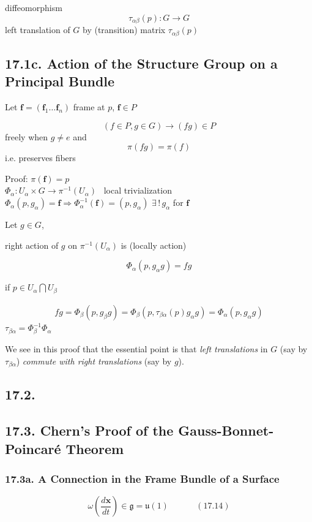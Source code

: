 diffeomorphism 
\[
\tau_{\alpha \beta}(p)  : G \to G
\]
left translation of $G$ by (transition) matrix $\tau_{\alpha \beta}(p)$



\subsection{ 17.1c. Action of the Structure Group on a Principal Bundle}

Let $\mathbf{f} = (\mathbf{f}_1 \dots \mathbf{f}_n)$ frame at $p$, $\mathbf{f} \in P$

\begin{theorem}[17.8]
  \[
(f \in P , g\in G) \to (fg) \in P 
\]
freely when $g\neq e$ and 
\[
\pi(fg) = \pi(f)
\]
i.e. preserves fibers
\end{theorem}

Proof:
  $\pi(\mathbf{f}) = p$ \\

$\Phi_{\alpha} : U_{\alpha} \times G \to \pi^{-1}(U_{\alpha})$ \quad \quad \, local trivialization \\
$\Phi_{\alpha}(p,g_{\alpha}) = \mathbf{f} \Longrightarrow \Phi_{\alpha}^{-1}(\mathbf{f}) = (p,g_{\alpha})$ 
\quad $\exists \, ! \, g_{\alpha}$ for $\mathbf{f}$

Let $g \in G$, 

right action of $g$ on $\pi^{-1}(U_{\alpha})$ is (locally action)

\[
\Phi_{\alpha}(p,g_{\alpha}g) = fg
\]

if $p \in U_{\alpha} \bigcap U_{\beta}$ 

\[
\begin{gathered}
  fg = \Phi_{\beta}(p,g_{\beta}g) = \Phi_{\beta}(p, \tau_{\beta \alpha}(p)g_{\alpha} g ) = \Phi_{\alpha}(p,g_{\alpha} g) 
\end{gathered}
\]
$\tau_{\beta \alpha} = \Phi_{\beta}^{-1} \Phi_{\alpha}$

\hrulefill

We see in this proof that the essential point is that \emph{left translations} in $G$ (say by $\tau_{\beta \alpha}$) \emph{ commute with right translations} (say by $g$).  



\subsection{ 17.2. }


\subsection{ 17.3. Chern's Proof of the Gauss-Bonnet-Poincar\'{e} Theorem }


\subsubsection{ 17.3a. A Connection in the Frame Bundle of a Surface }


\begin{equation}
  \omega \left( \frac{d\mathbf{x}}{dt} \right) \in \mathfrak{g} = \mathfrak{u}{ (1) } \quad \quad \quad \, (17.14)
\end{equation}






